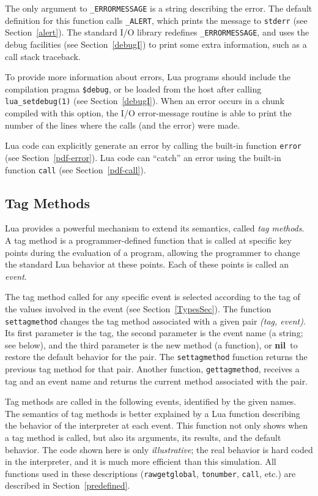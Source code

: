 \documentclass[11pt]{article}
\newcommand{\See}[1]{Section~\ref{#1}}
\newcommand{\see}[1]{(see \See{#1})}
\newcommand{\M}[1]{\rm\emph{#1}}
\newcommand{\T}[1]{{\tt #1}}
\newcommand{\nil}{{\bf nil}}
\newcommand{\IndexVerb}[1]{\T{#1}\index{#1}}
\newcommand{\Def}[1]{\emph{#1}\index{#1}}
\newcommand{\Deffunc}[1]{\index{#1}}
\begin{document}
The only argument to \verb|_ERRORMESSAGE| is a string
describing the error.
The default definition for
this function calls \verb|_ALERT|, \Deffunc{_ALERT}
which prints the message to \verb|stderr| \see{alert}.
The standard I/O library redefines \verb|_ERRORMESSAGE|,
and uses the debug facilities \see{debugI}
to print some extra information,
such as a call stack traceback.

To provide more information about errors,
Lua programs should include the compilation pragma \verb|$debug|,
\label{pragma}
or be loaded from the host after calling \verb|lua_setdebug(1)|
\see{debugI}.
When an error occurs in a chunk compiled with this option,
the I/O error-message routine is able to print the number of the
lines where the calls (and the error) were made.

Lua code can explicitly generate an error by calling the built-in
function \verb|error| \see{pdf-error}.
Lua code can ``catch'' an error using the built-in function
\verb|call| \see{pdf-call}.


\subsection{Tag Methods} \label{tag-method}

Lua provides a powerful mechanism to extend its semantics,
called \Def{tag methods}.
A tag method is a programmer-defined function
that is called at specific key points during the evaluation of a program,
allowing the programmer to change the standard Lua behavior at these points.
Each of these points is called an \Def{event}.

The tag method called for any specific event is selected
according to the tag of the values involved
in the event \see{TypesSec}.
The function \IndexVerb{settagmethod} changes the tag method
associated with a given pair \M{(tag, event)}.
Its first parameter is the tag, the second parameter is the event name
(a string; see below),
and the third parameter is the new method (a function),
or \nil\ to restore the default behavior for the pair.
The \verb|settagmethod| function returns the previous tag method for that pair.
Another function, \IndexVerb{gettagmethod},
receives a tag and an event name and returns the
current method associated with the pair.

Tag methods are called in the following events,
identified by the given names.
The semantics of tag methods is better explained by a Lua function
describing the behavior of the interpreter at each event.
This function not only shows when a tag method is called,
but also its arguments, its results, and the default behavior.
The code shown here is only \emph{illustrative};
the real behavior is hard coded in the interpreter,
and it is much more efficient than this simulation.
All functions used in these descriptions
(\verb|rawgetglobal|, \verb|tonumber|, \verb|call|, etc.)
are described in \See{predefined}.
\end{document}
